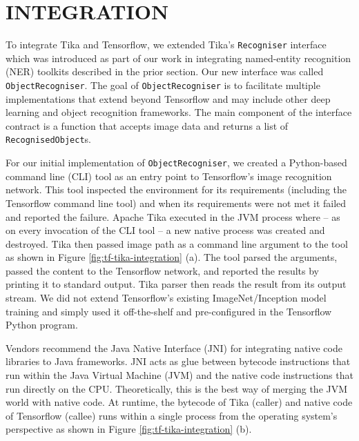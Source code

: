
\section{INTEGRATION} \label{sec:integration}
To integrate Tika and Tensorflow, we extended Tika's \texttt{Recogniser} interface which was introduced as part of our work in integrating named-entity recognition (NER) toolkits described in the prior section. Our new interface was called \texttt{ObjectRecogniser}. The goal of \texttt{ObjectRecogniser} is to facilitate multiple implementations that extend beyond Tensorflow and may include other deep learning and object recognition frameworks. The main component of the interface contract is a function that accepts image data and returns a list of \texttt{RecognisedObject}s.

For our initial implementation of \texttt{ObjectRecogniser}, we created a Python-based command line (CLI) tool as an entry point to Tensorflow's image recognition network. This tool inspected the environment for its requirements (including the Tensorflow command line tool) and when its requirements were not met it failed and reported the failure. Apache Tika executed in the JVM process where -- as on every invocation of the CLI tool -- a new native process was created and destroyed. Tika then passed image path as a command line argument to the tool as shown in Figure \ref{fig:tf-tika-integration} (a). The tool parsed the arguments, passed the content to the Tensorflow network, and reported the results by printing it to standard output. Tika parser then reads the result from its output stream. We did not extend Tensorflow's existing ImageNet/Inception model training and simply used it off-the-shelf and pre-configured in the Tensorflow Python program.

Vendors recommend the Java Native Interface (JNI) for integrating native code libraries to Java frameworks\cite{gordon1998essential}. JNI acts as glue between bytecode instructions that run within the Java Virtual Machine (JVM) and the native code instructions that run directly on the CPU. Theoretically, this is the best way of merging the JVM world with native code. At runtime, the bytecode of Tika (caller) and native code of Tensorflow (callee) runs within a single process from the operating system's perspective as shown in Figure \ref{fig:tf-tika-integration} (b).

